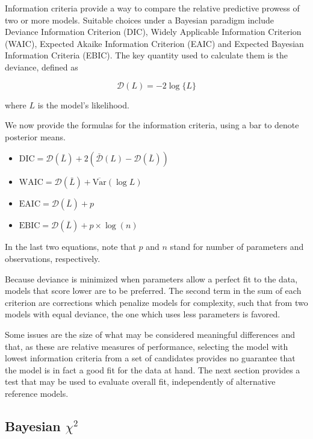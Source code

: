 Information criteria provide a way to compare the relative predictive prowess of two or more models. Suitable choices under a Bayesian paradigm include Deviance Information Criterion (DIC), Widely Applicable Information Criterion (WAIC), Expected Akaike Information Criterion (EAIC) and Expected Bayesian Information Criteria (EBIC). The key quantity used to calculate them is the deviance, defined as

\begin{equation}
\mathcal{D}(L)=-2\log\{L\}
\end{equation}

\noindent where $L$ is the model's likelihood.

We now provide the formulas for the information criteria, using a bar to denote posterior means.

\begin{itemize}
\item $\text{DIC}=\mathcal{D}(\bar L) + 2(\bar{\mathcal{D}} (L) - \mathcal{D} (\bar L))$
\item $\text{WAIC}=\mathcal{D}(\bar L) + \overline{\text{Var}}(\log L)$
\item $\text{EAIC}=\mathcal{D}(\bar L) + p$
\item $\text{EBIC}=\mathcal{D}(\bar L) + p \times \log (n)$
\end{itemize}

In the last two equations, note that $p$ and $n$ stand for number of parameters and observations, respectively.

Because deviance is minimized when parameters allow a perfect fit to the data, models that score lower are to be preferred. The second term in the sum of each criterion are corrections which penalize models for complexity, such that from two models with equal deviance, the one which uses less parameters is favored.

Some issues are the size of what may be considered meaningful differences and that, as these are relative measures of performance, selecting the model with lowest information criteria from a set of candidates provides no guarantee that the model is in fact a good fit for the data at hand. The next section provides a test that may be used to evaluate overall fit, independently of alternative reference models.

\subsection{Bayesian $\chi^2$}

